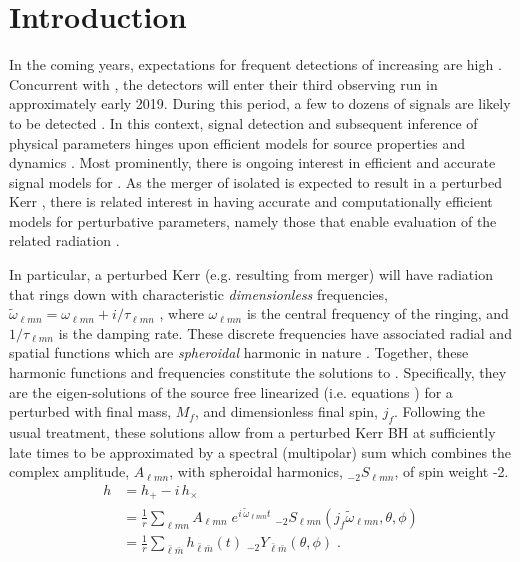 \documentclass[twocolumn,aps,prd,floatfix,preprintnumbers,a4paper,nofootinbib,
superscriptaddress,10pt]{revtex4-1}
\newcommand{\cw}{\tilde{\omega}}
\def\jf{j_f}
\def\mf{M_f}
\def\lmn{_{\ell m n}}
\def\LM{_{\bar{\ell} \bar{m}}}
\begin{document}
\section{Introduction}
%
In the coming years, expectations for frequent \gw{} detections of increasing \snr{} are high \cite{TheLIGOScientific:2016pea,Abbott:2016nhf,LIGOScientific:2018mvr}.
%
Concurrent with \virgo{}, the \aligo{} detectors will enter their third observing run in approximately early 2019.
%
During this period, a few to dozens of \bbh{} signals are likely to be detected \cite{Abbott:2016nhf,Abbott2018OS}.
%
In this context, signal detection and subsequent inference of physical parameters hinges upon efficient models for source properties and dynamics \cite{Abbott:2016wiq}.
%
Most prominently, there is ongoing interest in efficient and accurate signal models for \bbh{} \imr{} \cite{Blackman:2017dfb, London:2017bcn, Hannam:2013oca}.
%
As the merger of isolated  is expected to result in a perturbed Kerr \bh{}, there is related interest in having accurate and computationally efficient models for perturbative parameters, namely those that enable evaluation of the related \rd{} radiation \cite{Berti:2005ys,TheLIGOScientific:2016wfe}.
%
\par In particular, a perturbed Kerr \bh{} (e.g. resulting from \bbh{} merger) will have \gw{} radiation that rings down with characteristic \textit{dimensionless} frequencies,
%
$%
	\cw\lmn = \omega\lmn + i/\tau\lmn
$%
, where $\omega\lmn$ is the central frequency of the ringing, and $1/\tau\lmn$ is the damping rate.
%
These discrete frequencies have associated radial and spatial functions which are \textit{spheroidal} harmonic in nature \cite{Leaver85}.
%
Together, these harmonic functions and frequencies constitute the \qnm{} solutions to \ee{}.
%
Specifically, they are the eigen-solutions of the source free linearized \ee{} (i.e.  equations \cite{PhysRevLett.29.1114}) for a perturbed \bh{} with final mass, $\mf$, and dimensionless final spin, $\jf$.
%
Following the usual treatment, these solutions allow \grad{} from a perturbed Kerr BH at sufficiently late times to be approximated by a spectral (multipolar) sum which combines the complex \qnm{} amplitude, $A\lmn$, with spheroidal harmonics, $_{-2}S\lmn$, of spin weight -2.
%
\begin{align}
	\label{hrd}
	h &= h_{+} - i \, h_{\times}
	  \\ \nonumber
	  &= \frac{1}{r} \sum\lmn A\lmn \; e^{i\,\cw\lmn t} \; _{-2}S\lmn( \jf \cw\lmn,\theta,\phi)
		\\ \nonumber
		&= \frac{1}{r} \sum\LM h\LM(t) \; _{-2}Y\LM(\theta,\phi) \;  .
\end{align}
\end{document}
